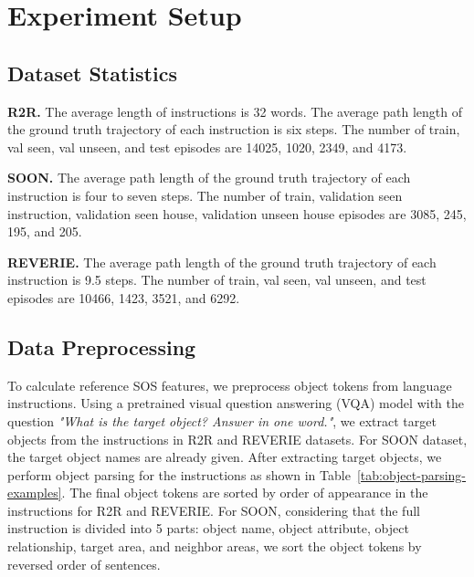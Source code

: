 \documentclass[10pt,twocolumn,letterpaper]{article}
\begin{document}
\section{Experiment Setup}\label{sec:experiment-setup}
\subsection{Dataset Statistics}
\noindent\textbf{R2R.} 
The average length of instructions is 32 words. The average path length of the ground truth trajectory of each instruction is six steps. The number of train, val seen, val unseen, and test episodes are \num[group-separator={,}]{14025}, 1020, 2349, and 4173.

\noindent\textbf{SOON.} \font=2.0pt
The average path length of the ground truth trajectory of each instruction is four to seven steps. The number of train, validation seen instruction, validation seen house, validation unseen house episodes are 3085, 245, 195, and 205.
\font=2.5pt

\noindent\textbf{REVERIE.} 
  The average path length of the ground truth trajectory of each instruction is
  9.5 steps. The number of train, val seen, val unseen, and test episodes are \num[group-separator={,}]{10466}, 1423, 3521, and 6292.

\subsection{Data Preprocessing}
To calculate reference SOS features, we preprocess object tokens from language instructions. Using a pretrained visual question answering (VQA) model \cite{antol2015vqa} with the question \textit{"What is the target object? Answer in one word."}, we extract target objects from the instructions in R2R and REVERIE datasets. For SOON dataset, the target object names are already given. After extracting target objects, we perform object parsing for the instructions as shown in Table~\ref{tab:object-parsing-examples}. The final object tokens are sorted by order of appearance in the instructions for R2R and REVERIE. For SOON, considering that the full instruction is divided into 5 parts: object name, object attribute, object relationship, target area, and neighbor areas, we sort the object tokens by reversed order of sentences.
\end{document}
